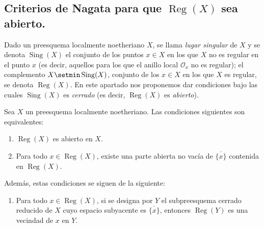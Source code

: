\subsection{Criterios de Nagata para que $\operatorname{Reg}(X)$ sea abierto.}
\label{IV.2.s6.12-fr}

\begin{env}[6.12.1]
\label{IV.2.s6.12.1-fr}
Dado un preesquema localmente noetheriano $X$, se llama \emph{lugar
singular} de $X$ y se denota $\operatorname{Sing}(X)$ el conjunto de los puntos
$x\in X$ en los que $X$ no es regular en el punto $x$ (es decir,
aquellos para los que el anillo local $\mathcal O_x$ no es regular); el
complemento $X\setmin\operatorname{Sing}(X)$, conjunto de los $x\in X$ en los que $X$
es regular, se denota $\operatorname{Reg}(X)$. En este apartado nos proponemos
dar condiciones bajo las cuales $\operatorname{Sing}(X)$ es \emph{cerrado} (es decir,
$\operatorname{Reg}(X)$ es \emph{abierto}).
\end{env}

\begin{proposition}[6.12.2]
\label{IV.2.s6.12.2-fr}
Sea $X$ un preesquema localmente noetheriano. Las condiciones siguientes son
equivalentes:
\begin{enumerate}
\item[\textup{a)}] $\operatorname{Reg}(X)$ es abierto en $X$.
\item[\textup{b)}] Para todo $x\in\operatorname{Reg}(X)$, existe una parte
abierta no vacía de $\overline{\{x\}}$ contenida en
$\operatorname{Reg}(X)$.
\end{enumerate}
Además, estas condiciones se siguen de la siguiente:
\begin{enumerate}
\item[\textup{c)}] Para todo $x\in\operatorname{Reg}(X)$, si se designa por $Y$ el
subpreesquema cerrado reducido de $X$ cuyo espacio subyacente es
$\overline{\{x\}}$, entonces $\operatorname{Reg}(Y)$ es una vecindad de $x$ en $Y$.
\end{enumerate}
\end{proposition}

